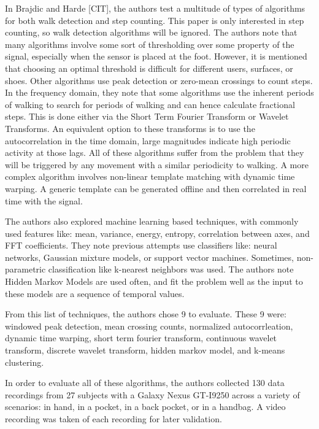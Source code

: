                 In Brajdic and Harde [CIT], the authors test a multitude of types of algorithms for both walk detection and step counting. This paper is only interested in step counting, so walk detection algorithms will be ignored. The authors note that many algorithms involve some sort of thresholding over some property of the signal, especially when the sensor is placed at the foot. However, it is mentioned that choosing an optimal threshold is difficult for different users, surfaces, or shoes. Other algorithms use peak detection or zero-mean crossings to count steps. In the frequency domain, they note that some algorithms use the inherent periods of walking to search for periods of walking and can hence calculate fractional steps. This is done either via the Short Term Fourier Transform or Wavelet Transforms. An equivalent option to these transforms is to use the autocorrelation in the time domain, large magnitudes indicate high periodic activity at those lags. All of these algorithms suffer from the problem that they will be triggered by any movement with a similar periodicity to walking. A more complex algorithm involves non-linear template matching with dynamic time warping. A generic template can be generated offline and then correlated in real time with the signal. 

                The authors also explored machine learning based techniques, with commonly used features like: mean, variance, energy, entropy, correlation between axes, and FFT coefficients. They note previous attempts use classifiers like: neural networks, Gaussian mixture models, or support vector machines. Sometimes, non-parametric classification like k-nearest neighbors was used. The authors note Hidden Markov Models are used often, and fit the problem well as the input to these models are a sequence of temporal values.

                From this list of techniques, the authors chose 9 to evaluate. These 9 were: windowed peak detection, mean crossing counts, normalized autocorrleation, dynamic time warping, short term fourier transform, continuous wavelet transform, discrete wavelet transform, hidden markov model, and k-means clustering. 

                In order to evaluate all of these algorithms, the authors collected 130 data recordings from 27 subjects with a Galaxy Nexus GT-I9250 across a variety of scenarios: in hand, in a pocket, in a back pocket, or in a handbag. A video recording was taken of each recording for later validation.


